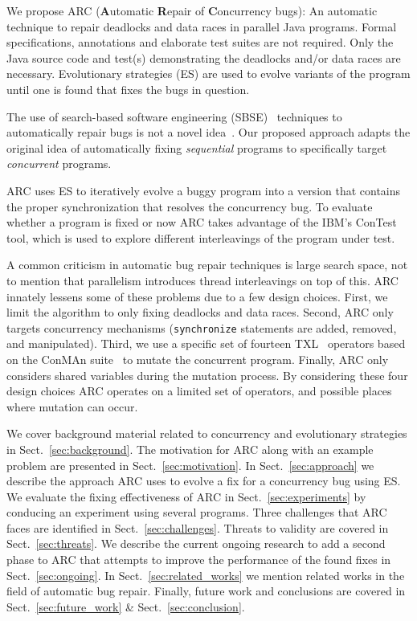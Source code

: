 \documentclass{llncs}
\begin{document}
We propose ARC (\textbf{A}utomatic \textbf{R}epair of \textbf{C}oncurrency
bugs): An automatic technique to repair deadlocks and data races in parallel
Java programs. Formal specifications, annotations and elaborate test suites are
not required. Only the Java source code and test(s) demonstrating the deadlocks
and/or data races are necessary. Evolutionary strategies (ES) are used to evolve
variants of the program until one is found that fixes the bugs in question.

The use of search-based software engineering (SBSE)~\cite{Har+10} techniques to
automatically repair bugs is not a novel idea~\cite{FNWG09, AY08, Arc08, WT10,
WNLF09, WFGN10}. Our proposed approach adapts the original idea of
automatically fixing \textit{sequential} programs to specifically target
\textit{concurrent} programs.

ARC uses ES to iteratively evolve a buggy program into a version that contains
the proper synchronization that resolves the concurrency bug. To evaluate
whether a program is fixed or now ARC takes advantage of the IBM's
ConTest~\cite{EFN+02} tool, which is used to explore different interleavings of
the program under test.

A common criticism in automatic bug repair techniques is large search space,
not to mention that parallelism introduces thread interleavings on top of this.
ARC innately lessens some of these problems due to a few design choices. First,
we limit the algorithm to only fixing deadlocks and data races. Second, ARC
only targets concurrency mechanisms (\texttt{synchronize} statements are added,
removed, and manipulated). Third, we use a specific set of fourteen
TXL~\cite{CHP91} operators based on the ConMAn suite~\cite{BCD06} to mutate the
concurrent program.  Finally, ARC only considers shared variables during the
mutation process. By considering these four design choices ARC operates on a
limited set of operators, and possible places where mutation can occur.

We cover background material related to concurrency and evolutionary strategies
in Sect.~\ref{sec:background}. The motivation for ARC along with an example
problem are presented in Sect.~\ref{sec:motivation}. In
Sect.~\ref{sec:approach} we describe the approach ARC uses to evolve a fix for
a concurrency bug using ES. We evaluate the fixing effectiveness of ARC in
Sect.~\ref{sec:experiments} by conducing an experiment using several programs.
Three challenges that ARC faces are identified in Sect.~\ref{sec:challenges}.
Threats to validity are covered in Sect.~\ref{sec:threats}. We describe the current
ongoing research to add a second phase to ARC that attempts to improve the
performance of the found fixes in Sect.~\ref{sec:ongoing}. In
Sect.~\ref{sec:related_works} we mention related works in the field of
automatic bug repair. Finally, future work and conclusions are covered in
Sect.~\ref{sec:future_work} \& Sect.~\ref{sec:conclusion}.
\end{document}
